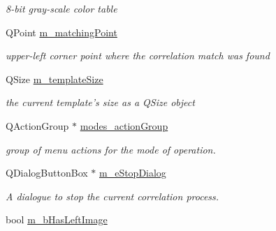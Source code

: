 \begin{DoxyCompactItemize}
\begin{DoxyCompactList}\small\item\em 8-\/bit gray-\/scale color table \item\end{DoxyCompactList}\item 
\hypertarget{classQcorr_a8a7f00160ae46441cef038149cf28bdc}{
QPoint \hyperlink{classQcorr_a8a7f00160ae46441cef038149cf28bdc}{m\_\-matchingPoint}}
\label{classQcorr_a8a7f00160ae46441cef038149cf28bdc}

\begin{DoxyCompactList}\small\item\em upper-\/left corner point where the correlation match was found \item\end{DoxyCompactList}\item 
\hypertarget{classQcorr_abc48bdd2110cfdaf7b98dde1cdf42f18}{
QSize \hyperlink{classQcorr_abc48bdd2110cfdaf7b98dde1cdf42f18}{m\_\-templateSize}}
\label{classQcorr_abc48bdd2110cfdaf7b98dde1cdf42f18}

\begin{DoxyCompactList}\small\item\em the current template's size as a QSize object \item\end{DoxyCompactList}\item 
\hypertarget{classQcorr_a3a964df80562c062d5f1f4f6cbf841bb}{
QActionGroup $\ast$ \hyperlink{classQcorr_a3a964df80562c062d5f1f4f6cbf841bb}{modes\_\-actionGroup}}
\label{classQcorr_a3a964df80562c062d5f1f4f6cbf841bb}

\begin{DoxyCompactList}\small\item\em group of menu actions for the mode of operation. \item\end{DoxyCompactList}\item 
\hypertarget{classQcorr_a496beab48555a8c9abbd6f6aa48e52fb}{
QDialogButtonBox $\ast$ \hyperlink{classQcorr_a496beab48555a8c9abbd6f6aa48e52fb}{m\_\-eStopDialog}}
\label{classQcorr_a496beab48555a8c9abbd6f6aa48e52fb}

\begin{DoxyCompactList}\small\item\em A dialogue to stop the current correlation process. \item\end{DoxyCompactList}\item 
\hypertarget{classQcorr_ab5325b11a64e24eeb6b9bdc27a77d0ad}{
bool \hyperlink{classQcorr_ab5325b11a64e24eeb6b9bdc27a77d0ad}{m\_\-bHasLeftImage}}
\label{classQcorr_ab5325b11a64e24eeb6b9bdc27a77d0ad}


\end{DoxyCompactItemize}
